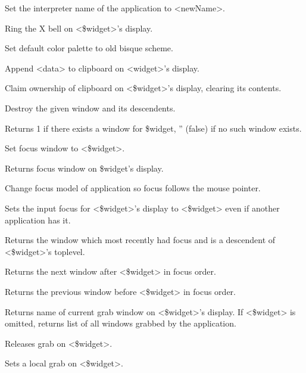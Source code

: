 \begin{enum}{1cm}

Set the interpreter name of the application to <newName>.

Ring the X bell on <\$widget>'s display.

Set default color palette to old bisque scheme.

Append <data> to clipboard on <widget>'s display.

Claim ownership of clipboard on <\$widget>'s display, clearing its contents.

Destroy the given window and its descendents.

Returns 1 if there exists a window for \$widget, '' (false) if no such window exists. 

Set focus window to <\$widget>.

Returns focus window on \$widget's display.

Change focus model of application so focus follows the mouse pointer.

Sets the input focus for <\$widget>'s display to <\$widget>
even if another application has it.

Returns the window which most recently had focus and is a descendent
of <\$widget>'s toplevel.

Returns the next window after <\$widget> in focus order.

Returns the previous window before <\$widget> in focus order.

Returns name of current grab window on <\$widget>'s display. If <\$widget> is
omitted, returns list of all windows grabbed by the application.

Releases grab on <\$widget>.

Sets a local grab on <\$widget>.


\end{enum}
